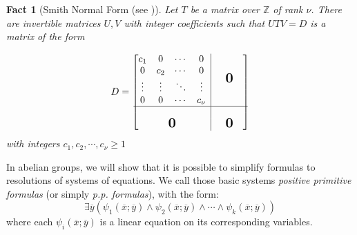 \documentclass[10pt,a4paper]{amsart}
\newcommand{\bigzero}{\mbox{\normalfont\Large\bfseries 0}}
\newcommand{\rvline}{\hspace*{-\arraycolsep}\vline\hspace*{-\arraycolsep}}
\newtheorem{fact}[prop]{Fact}
\theoremstyle{definition}
\newcommand{\bh}{\begin{fact}}
\newcommand{\eh}{\end{fact}}
\newcommand{\ov}[1]{\overline{#1}}
\begin{document}
\bh [Smith Normal Form (see \cite{Smith1861})] \label{Fact:SmithNormalForm} Let $T$ be a matrix over $\mathbb{Z}$ of rank $\nu$. There are invertible matrices $U,V$ with integer coefficients such that $UTV=D$ is a matrix of the form

\[
D=\begin{bmatrix}
  \begin{matrix}
  c_1 & 0 & \cdots & 0 \\
  0 & c_2 & \cdots & 0 \\
  \vdots & \vdots & \ddots & \vdots\\
  0 & 0 &\cdots & c_{\nu}
  \end{matrix}
  & \rvline & & \bigzero & \\
\hline
& \rvline &\\
  \bigzero & \rvline & & \bigzero
\end{bmatrix}
\]with integers $c_1,c_2,\cdots,c_\nu\geq 1$
\eh
In abelian groups, we will show that it is possible to simplify formulas to resolutions of systems of equations. We call those basic systems \emph{positive primitive formulas} (or simply \emph{p.p. formulas}), with the form: \[\exists \ov{y}(\psi_1(\ov{x};\ov{y})\wedge \psi_2(\ov{x};\ov{y})\wedge \cdots \wedge \psi_k(\ov{x};\ov{y}))\]
where each $\psi_i(\ov{x};\ov{y})$ is a linear equation on its corresponding variables.\\
\end{document}
